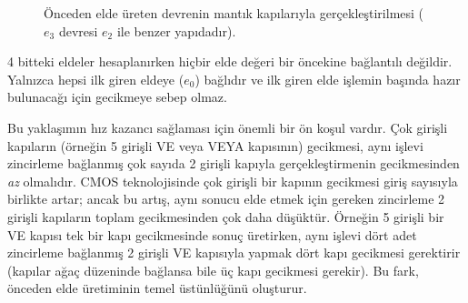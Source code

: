 \begin{figure}[htbp]
\caption[Önceden elde üreten devre]{Önceden elde üreten devrenin mantık kapılarıyla gerçekleştirilmesi ($e_3$ devresi $e_2$ ile benzer yapıdadır).}
\label{fig:onceden-elde}
\end{figure}

4 bitteki eldeler hesaplanırken hiçbir elde değeri bir öncekine bağlantılı değildir. Yalnızca hepsi ilk giren eldeye ($e_0$) bağlıdır ve ilk giren elde işlemin başında hazır bulunacağı için gecikmeye sebep olmaz.

Bu yaklaşımın hız kazancı sağlaması için önemli bir ön koşul vardır. Çok girişli kapıların (örneğin 5 girişli VE veya VEYA kapısının) gecikmesi, aynı işlevi zincirleme bağlanmış çok sayıda 2 girişli kapıyla gerçekleştirmenin gecikmesinden \emph{az} olmalıdır. CMOS teknolojisinde çok girişli bir kapının gecikmesi giriş sayısıyla birlikte artar; ancak bu artış, aynı sonucu elde etmek için gereken zincirleme 2 girişli kapıların toplam gecikmesinden çok daha düşüktür. Örneğin 5 girişli bir VE kapısı tek bir kapı gecikmesinde sonuç üretirken, aynı işlevi dört adet zincirleme bağlanmış 2 girişli VE kapısıyla yapmak dört kapı gecikmesi gerektirir (kapılar ağaç düzeninde bağlansa bile üç kapı gecikmesi gerekir). Bu fark, önceden elde üretiminin temel üstünlüğünü oluşturur.


